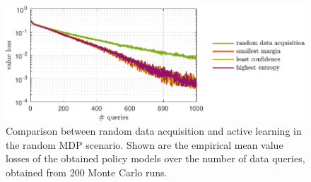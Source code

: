 \documentclass[twoside,11pt]{article}
\begin{document}
\begin{figure}[]
	\centering
	\includegraphics[scale=1]{images/activeLearning/activeLearning.pdf}
	\caption{Comparison between random data acquisition and active learning in the random MDP scenario. Shown are the empirical mean value losses of the obtained policy models over the number of data queries, obtained from 200 Monte Carlo runs.}
%
	\label{fig:activeLearning}
\end{figure}
\end{document}
